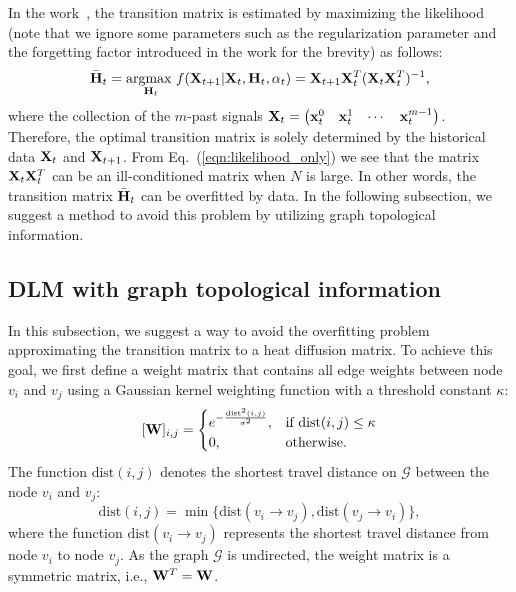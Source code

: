 \documentclass[journal]{IEEEtran}
\begin{document}
In the work~\cite{kwak2020travel}, the transition matrix is estimated by maximizing the likelihood (note that we ignore some parameters such as the regularization parameter and the forgetting factor introduced in the work for the brevity) as follows:
\begin{equation}\label{eqn:likelihood_only}
\begin{aligned}
    \bar{\bf{H}}_t=\underset{{\bf{H}}_t}{\text{argmax }}f({\bf{X}}_{t+1}|{\bf{X}}_{t},{\bf{H}}_{t},\alpha_t)={\bf{X}}_{t+1}{\bf{X}}_t^T({\bf{X}}_{t}{\bf{X}}_t^T)^{-1},
\end{aligned}
\end{equation}
where the collection of the $m$-past signals ${\bf{X}}_t=\begin{pmatrix}{\bf{x}}_t^{0}&{\bf{x}}_t^{1}&\cdots&{\bf{x}}_t^{{m-1}}\end{pmatrix}$. Therefore, the optimal transition matrix is solely determined by the historical data ${\bf{X}}_t$ and ${\bf{X}}_{t+1}$. From Eq.~(\ref{eqn:likelihood_only}) we see that the matrix ${\bf{X}}_{t}{\bf{X}}_t^T$ can be an ill-conditioned matrix when $N$ is large. In other words, the transition matrix ${\bar{\bf{H}}}_t$ can be overfitted by data. In the following subsection, we suggest a method to avoid this problem by utilizing graph topological information.

\subsection{DLM with graph topological information}
In this subsection, we suggest a way to avoid the overfitting problem approximating the transition matrix to a heat diffusion matrix. To achieve this goal, we first define a weight matrix that contains all edge weights between node $v_i$ and $v_j$ using a Gaussian kernel weighting function with a threshold constant $\kappa$:
\begin{equation}\label{eqn:gaussianthreshold}
    [{\bf{W}}]_{i,j}=
    \begin{cases}
      e^{{-\frac{ \text{dist}^2(i,j)}{\sigma^2}}}, & \text{if}\ \text{dist}(i,j)\le\kappa \\
      0, & \text{otherwise}.
    \end{cases}
\end{equation}
The function $\text{dist}(i,j)$ denotes the shortest travel distance on $\mathcal{G}$ between the node $v_i$ and $v_j$:
\begin{equation}
    \text{dist}(i,j)=\min\{\text{dist}(v_i\rightarrow v_j),\text{dist}(v_j\rightarrow v_i)\},
\end{equation}
where the function $\text{dist}(v_i\rightarrow v_j)$ represents the shortest travel distance from node $v_i$ to node $v_j$.
As the graph $\mathcal{G}$ is undirected, the weight matrix is a symmetric matrix, i.e., ${\bf{W}}^T={\bf{W}}$.
\end{document}

